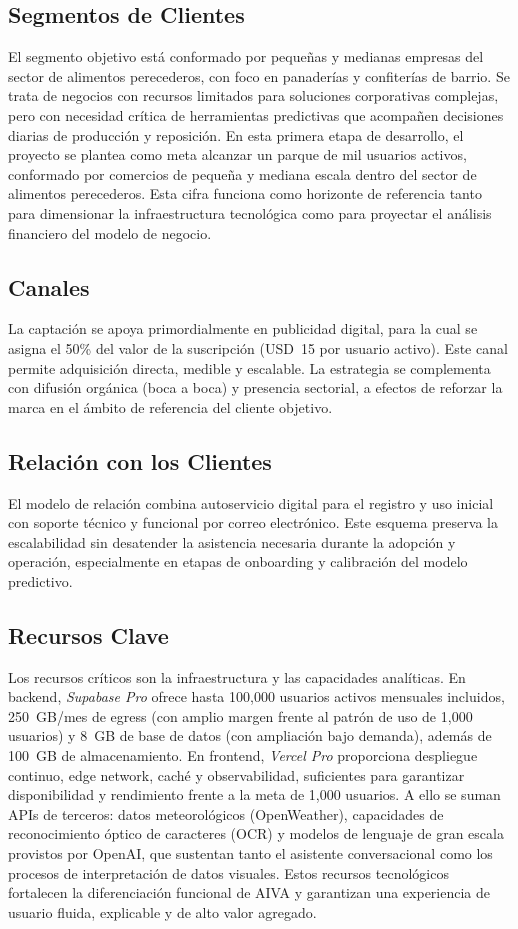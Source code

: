 \subsection{Segmentos de Clientes}
El segmento objetivo está conformado por pequeñas y medianas empresas del sector de alimentos perecederos, con foco en panaderías y confiterías de barrio. Se trata de negocios con recursos limitados para soluciones corporativas complejas, pero con necesidad crítica de herramientas predictivas que acompañen decisiones diarias de producción y reposición.
En esta primera etapa de desarrollo, el proyecto se plantea como meta alcanzar un parque de mil usuarios activos, conformado por comercios de pequeña y mediana escala dentro del sector de alimentos perecederos. Esta cifra funciona como horizonte de referencia tanto para dimensionar la infraestructura tecnológica como para proyectar el análisis financiero del modelo de negocio.

\subsection{Canales}
La captación se apoya primordialmente en publicidad digital, para la cual se asigna el 50\% del valor de la suscripción (USD~15 por usuario activo). Este canal permite adquisición directa, medible y escalable. La estrategia se complementa con difusión orgánica (boca a boca) y presencia sectorial, a efectos de reforzar la marca en el ámbito de referencia del cliente objetivo.

\subsection{Relación con los Clientes}
El modelo de relación combina autoservicio digital para el registro y uso inicial con soporte técnico y funcional por correo electrónico. Este esquema preserva la escalabilidad sin desatender la asistencia necesaria durante la adopción y operación, especialmente en etapas de onboarding y calibración del modelo predictivo.

\subsection{Recursos Clave}
Los recursos críticos son la infraestructura y las capacidades analíticas. En backend, \emph{Supabase Pro} ofrece hasta 100{,}000 usuarios activos mensuales incluidos, 250~GB/mes de egress (con amplio margen frente al patrón de uso de 1{,}000 usuarios) y 8~GB de base de datos (con ampliación bajo demanda), además de 100~GB de almacenamiento. En frontend, \emph{Vercel Pro} proporciona despliegue continuo, edge network, caché y observabilidad, suficientes para garantizar disponibilidad y rendimiento frente a la meta de 1{,}000 usuarios. A ello se suman APIs de terceros: datos meteorológicos (OpenWeather), capacidades de reconocimiento óptico de caracteres (OCR) y modelos de lenguaje de gran escala provistos por OpenAI, que sustentan tanto el asistente conversacional como los procesos de interpretación de datos visuales. Estos recursos tecnológicos fortalecen la diferenciación funcional de AIVA y garantizan una experiencia de usuario fluida, explicable y de alto valor agregado.

